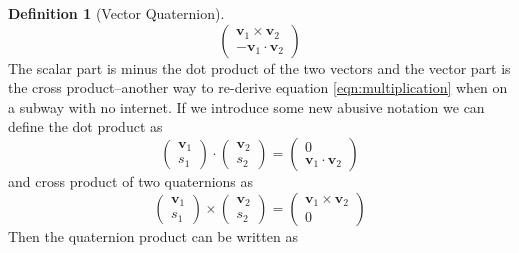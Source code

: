 \documentclass{amsart}
\theoremstyle{definition}
\newtheorem{definition}[theorem]{Definition}
\theoremstyle{remark}
\numberwithin{equation}{section}
\begin{document}
\begin{definition}[Vector Quaternion]
\begin{equation}
\begin{pmatrix}
      \mathbf{v}_1 \times \mathbf{v}_2\\
      -\mathbf{v}_1\cdot \mathbf{v}_2
    \end{pmatrix}
  \end{equation}
  The scalar part is minus the dot product of the two vectors and the vector part is the cross product--another way to re-derive equation \ref{eqn:multiplication} when on a subway with no internet. If we introduce some new abusive notation we can define the dot product as
\begin{equation}
		\begin{pmatrix}
      \mathbf{v}_1 \\
      s_1
    \end{pmatrix}
    \cdot
    \begin{pmatrix}
      \mathbf{v}_2 \\
      s_2
    \end{pmatrix}
    =
    \begin{pmatrix}
      0 \\
      \mathbf{v}_1 \cdot \mathbf{v}_2
    \end{pmatrix}
	\end{equation}
	and cross product of two quaternions as
	\begin{equation}
	\begin{pmatrix}
      \mathbf{v}_1 \\
      s_1
    \end{pmatrix}
    \times
    \begin{pmatrix}
      \mathbf{v}_2 \\
      s_2
    \end{pmatrix}
    =
    \begin{pmatrix}
      \mathbf{v}_1 \times \mathbf{v}_2 \\
      0
    \end{pmatrix}
	\end{equation}
	Then the quaternion product can be written as
\end{definition}
\end{document}
